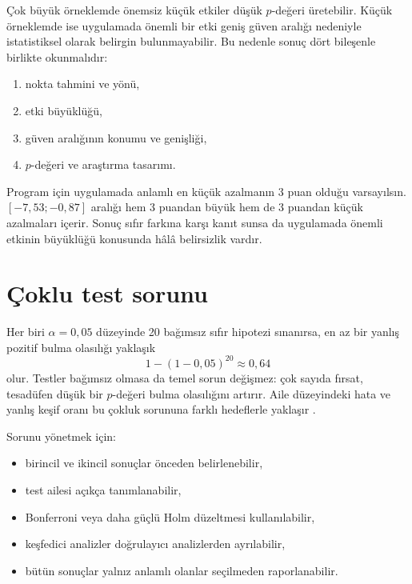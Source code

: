 Çok büyük örneklemde önemsiz küçük etkiler düşük $p$-değeri üretebilir. Küçük
örneklemde ise uygulamada önemli bir etki geniş güven aralığı nedeniyle
istatistiksel olarak belirgin bulunmayabilir. Bu nedenle sonuç dört bileşenle
birlikte okunmalıdır:

\begin{enumerate}
  \item nokta tahmini ve yönü,
  \item etki büyüklüğü,
  \item güven aralığının konumu ve genişliği,
  \item $p$-değeri ve araştırma tasarımı.
\end{enumerate}

Program için uygulamada anlamlı en küçük azalmanın 3 puan olduğu varsayılsın.
$[-7{,}53;-0{,}87]$ aralığı hem 3 puandan büyük hem de 3 puandan küçük
azalmaları içerir. Sonuç sıfır farkına karşı kanıt sunsa da uygulamada önemli
etkinin büyüklüğü konusunda hâlâ belirsizlik vardır.

\section{Çoklu test sorunu}

Her biri $\alpha=0{,}05$ düzeyinde 20 bağımsız sıfır hipotezi sınanırsa, en az
bir yanlış pozitif bulma olasılığı yaklaşık
\[
1-(1-0{,}05)^{20}\approx0{,}64
\]
olur. Testler bağımsız olmasa da temel sorun değişmez: çok sayıda fırsat,
tesadüfen düşük bir $p$-değeri bulma olasılığını artırır. Aile düzeyindeki
hata ve yanlış keşif oranı bu çokluk sorununa farklı hedeflerle yaklaşır
\cite{tukey1953,benjamini1995}.

Sorunu yönetmek için:

\begin{itemize}
  \item birincil ve ikincil sonuçlar önceden belirlenebilir,
  \item test ailesi açıkça tanımlanabilir,
  \item Bonferroni veya daha güçlü Holm düzeltmesi kullanılabilir,
  \item keşfedici analizler doğrulayıcı analizlerden ayrılabilir,
  \item bütün sonuçlar yalnız anlamlı olanlar seçilmeden raporlanabilir.
\end{itemize}

